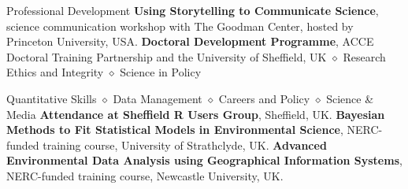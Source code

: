\begin{rubric}{Professional Development}
\entry*[2020] \textbf{Using Storytelling to Communicate Science}, science communication workshop with The Goodman Center, hosted by Princeton University, USA.
\entry*[2014 -- 2018] \textbf{Doctoral Development
Programme}, ACCE Doctoral Training Partnership and the University of Sheffield, UK $\diamond$ Research Ethics and Integrity $\diamond$ Science in Policy \par Quantitative Skills $\diamond$ Data Management $\diamond$ Careers and Policy $\diamond$ Science \& Media
\entry*[2014 -- 2018] \textbf{Attendance at Sheffield R Users Group}, Sheffield, UK.
\entry*[2016] \textbf{Bayesian Methods to Fit Statistical Models in
Environmental Science}, NERC-funded training course, University of Strathclyde, UK.
\entry*[2015] \textbf{Advanced Environmental Data Analysis using
Geographical Information Systems}, NERC-funded training course, Newcastle University, UK.

\end{rubric}